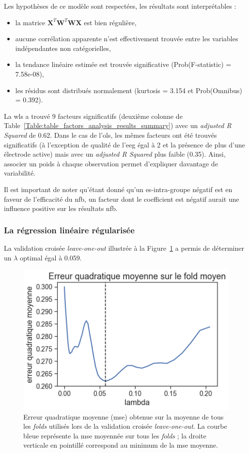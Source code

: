 Les hypothèses de ce modèle sont respectées, les résultats sont interprétables :
\begin{itemize}
	\item la matrice ${\textbf{X}}^{T}\textbf{W}^{T}\textbf{WX}$ est bien régulière,
  \item aucune corrélation apparente n'est effectivement trouvée entre les variables indépendantes non catégorielles, 
  \item la tendance linéaire estimée est trouvée significative (Prob(F-statistic) = 7.58e-08),
  \item les résidus sont distribués normalement (kurtosis = 3.154 et Prob(Omnibus) = 0.392).
\end{itemize}

La \gls{wls} a trouvé 9 facteurs significatifs (deuxième colonne de Table~\ref{Table:table_factors_analysis_results_summary}) avec un \textit{adjusted R Squared} de 0.62. 
Dans le cas de l'\gls{ols}, les mêmes facteurs ont été trouvés significatifs (à l'exception de qualité de 
l'\gls{eeg} égal à 2 et la présence de plus d'une électrode active) mais avec un \textit{adjusted R Squared} plus faible (0.35). Ainsi, associer un poids
à chaque observation permet d'expliquer davantage de variabilité. 

Il est important de noter qu'étant donné qu'un \gls{es}-intra-groupe négatif est en faveur de l'efficacité du \gls{nfb},
un facteur dont le coefficient est négatif aurait une influence positive sur les résultats \gls{nfb}.


\subsubsection{La régression linéaire régularisée}

La validation croisée \textit{leave-one-out} illustrée à la Figure~\ref{Figure:selection_lambda_lasso} a permis de déterminer un $\lambda$ optimal égal à 0.059.
\begin{figure}[h!]
  \centering
	\includegraphics[width=0.7\linewidth]{figures/chapter-3/factors-selection-lasso-best-lambda} 
  \caption{Erreur quadratique moyenne (\gls{mse}) obtenue sur la moyenne de tous les \textit{folds} utilisés lors de la validation 
	croisée \textit{leave-one-out}. La courbe bleue représente la \gls{mse} moyennée sur tous les \textit{folds} ; la droite verticale en pointillé correspond
	au minimum de la \gls{mse} moyenne.}
  \label{Figure:selection_lambda_lasso}
\end{figure}

